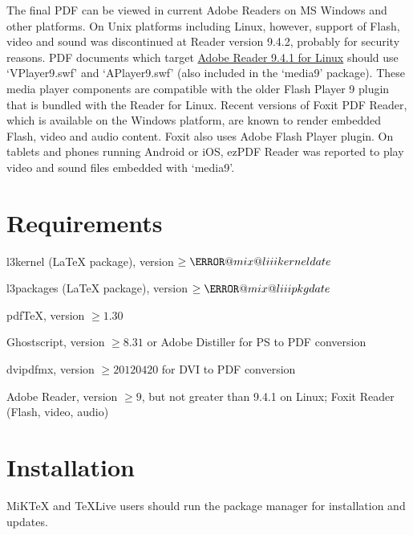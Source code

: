 \documentclass[a4paper]{article}
\begin{document}
The final PDF can be viewed in current Adobe Readers on MS Windows and other platforms. On Unix platforms including Linux, however, support of Flash, video and sound was discontinued at Reader version 9.4.2, probably for security reasons. PDF documents which target \href{ftp://ftp.adobe.com/pub/adobe/reader/unix/9.x/9.4.1/}{Adobe Reader 9.4.1 for Linux} should use `VPlayer9.swf' and `APlayer9.swf' (also included in the `media9' package). These media player components are compatible with the older Flash Player 9 plugin that is bundled with the Reader for Linux. Recent versions of Foxit PDF Reader, which is available on the Windows platform, are known to render embedded Flash, video and audio content. Foxit also uses Adobe Flash Player plugin. On tablets and phones running Android or iOS, ezPDF Reader was reported to play video and sound files embedded with `media9'.

\section{Requirements}
\begin{trivlist}
\makeatletter
\item l3kernel (\LaTeX{} package), version $\ge \g@mix@liiikerneldate$
\item l3packages (\LaTeX{} package), version $\ge \g@mix@liiipkgdate$
\makeatother
\item pdf\TeX{}, version $\ge1.30$
\item Ghostscript, version $\ge8.31$ or Adobe Distiller for PS to PDF conversion
\item dvipdfmx, version $\ge 20120420$ for DVI to PDF conversion
\item Adobe Reader, version $\ge9$, but not greater than 9.4.1 on Linux; Foxit Reader (Flash, video, audio)
\end{trivlist}

\section{Installation}
MiK\TeX{} and \TeX{}Live users should run the package manager for installation and updates.
\end{document}
